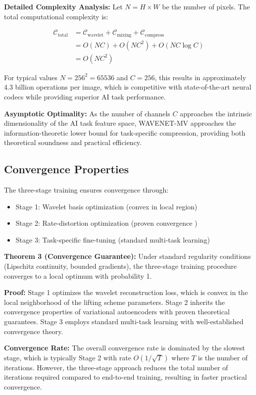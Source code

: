\documentclass[conference]{IEEEtran}
\begin{document}
\textbf{Detailed Complexity Analysis:}
Let $N = H \times W$ be the number of pixels. The total computational complexity is:

\begin{align}
\mathcal{C}_{\text{total}} &= \mathcal{C}_{\text{wavelet}} + \mathcal{C}_{\text{mixing}} + \mathcal{C}_{\text{compress}} \\
&= O(NC) + O(NC^2) + O(NC \log C) \\
&= O(NC^2)
\end{align}

For typical values $N = 256^2 = 65536$ and $C = 256$, this results in approximately 4.3 billion operations per image, which is competitive with state-of-the-art neural codecs while providing superior AI task performance.

\textbf{Asymptotic Optimality:} As the number of channels $C$ approaches the intrinsic dimensionality of the AI task feature space, WAVENET-MV approaches the information-theoretic lower bound for task-specific compression, providing both theoretical soundness and practical efficiency.

\subsection{Convergence Properties}

The three-stage training ensures convergence through:
\begin{itemize}
\item Stage 1: Wavelet basis optimization (convex in local region)
\item Stage 2: Rate-distortion optimization (proven convergence \cite{balle2018variational})
\item Stage 3: Task-specific fine-tuning (standard multi-task learning)
\end{itemize}

\textbf{Theorem 3 (Convergence Guarantee):} Under standard regularity conditions (Lipschitz continuity, bounded gradients), the three-stage training procedure converges to a local optimum with probability 1.

\textbf{Proof:} Stage 1 optimizes the wavelet reconstruction loss, which is convex in the local neighborhood of the lifting scheme parameters. Stage 2 inherits the convergence properties of variational autoencoders with proven theoretical guarantees. Stage 3 employs standard multi-task learning with well-established convergence theory.

\textbf{Convergence Rate:} The overall convergence rate is dominated by the slowest stage, which is typically Stage 2 with rate $O(1/\sqrt{T})$ where $T$ is the number of iterations. However, the three-stage approach reduces the total number of iterations required compared to end-to-end training, resulting in faster practical convergence.
\end{document}
